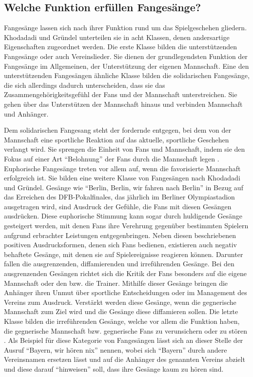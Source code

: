 \subsection{Welche Funktion erfüllen Fangesänge?}
Fangesänge lassen sich nach ihrer Funktion rund um das Spielgeschehen gliedern.
Khodadadi und Gründel unterteilen sie in acht Klassen, denen andersartige Eigenschaften zugeordnet werden.\cite[S. 10]{FK14}
Die erste Klasse bilden die unterstützenden Fangesänge oder auch Vereinslieder.
Sie dienen der grundlegendsten Funktion der Fangesänge im Allgemeinen, der Unterstützung der eigenen Mannschaft.
Eine den unterstützenden Fangesängen ähnliche Klasse bilden die solidarischen Fangesänge, die sich allerdings dadurch unterscheiden, dass sie das Zusammengehörigkeitsgefühl der Fans und der Mannschaft unterstreichen.
Sie gehen über das Unterstützen der Mannschaft hinaus und verbinden Mannschaft und Anhänger.

Dem solidarischen Fangesang steht der fordernde entgegen, bei dem von der Mannschaft eine sportliche Reaktion auf das aktuelle, sportliche Geschehen verlangt wird.
Sie sprengen die Einheit von Fans und Mannschaft, indem sie den Fokus auf einer Art "`Belohnung"' der Fans durch die Mannschaft legen \cite[S. 10]{FK14}.
Euphorische Fangesänge treten vor allem auf, wenn die favorisierte Mannschaft erfolgreich ist.
Sie bilden eine weitere Klasse von Fangesängen nach Khodadadi und Gründel.
Gesänge wie "`Berlin, Berlin, wir fahren nach Berlin"' in Bezug auf das Erreichen des DFB-Pokalfinales, das jährlich im Berliner Olympiastadion ausgetragen wird, sind Ausdruck der Gefühle, die Fans mit diesen Gesängen ausdrücken.
Diese euphorische Stimmung kann sogar durch huldigende Gesänge gesteigert werden, mit denen Fans ihre Verehrung gegenüber bestimmten Spielern aufgrund erbrachter Leistungen entgegenbringen.
Neben diesen beschriebenen positiven Ausdrucksformen, denen sich Fans bedienen, existieren auch negativ behaftete Gesänge, mit denen sie auf Spielereignisse reagieren können.
Darunter fallen die ausgrenzenden, diffamierenden und irreführenden Gesänge.
Bei den ausgrenzenden Gesängen richtet sich die Kritik der Fans besonders auf die eigene Mannschaft oder den bzw. die Trainer.
Mithilfe dieser Gesänge bringen die Anhänger ihren Unmut über sportliche Entscheidungen oder im Management des Vereins zum Ausdruck.
Verstärkt werden diese Gesänge, wenn die gegnerische Mannschaft zum Ziel wird und die Gesänge diese diffamieren sollen.
Die letzte Klasse bilden die irreführenden Gesänge, welche vor allem die Funktion haben, die gegnerische Mannschaft bzw. gegnerische Fans zu verunsichern oder zu stören \cite[S. 11]{FK14}.
Als Beispiel für diese Kategorie von Fangesängen lässt sich an dieser Stelle der Ausruf "`Bayern, wir hören nix"' nennen, wobei sich "`Bayern"' durch andere Vereinsnamen ersetzen lässt und auf die Anhänger des genannten Vereins abzielt und diese darauf "`hinweisen"' soll, dass ihre Gesänge kaum zu hören sind.

